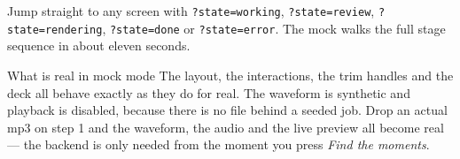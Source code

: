 \documentclass[11pt,a4paper]{article}
\newcommand{\code}[1]{\texttt{\small #1}}
\begin{document}
Jump straight to any screen with \code{?state=working}, \code{?state=review},
\code{?state=rendering}, \code{?state=done} or \code{?state=error}. The mock
walks the full stage sequence in about eleven seconds.

\begin{note}{What is real in mock mode}
The layout, the interactions, the trim handles and the deck all behave exactly
as they do for real. The waveform is synthetic and playback is disabled, because
there is no file behind a seeded job. Drop an actual mp3 on step 1 and the
waveform, the audio and the live preview all become real --- the backend is only
needed from the moment you press \emph{Find the moments}.
\end{note}
\end{document}

